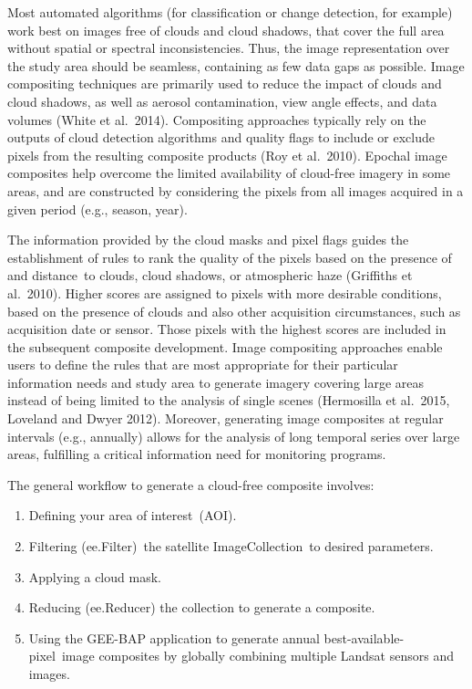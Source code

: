 \documentclass[
  letterpaper,
  DIV=11,
  numbers=noendperiod]{scrreprt}
\providecommand{\tightlist}{%
  \setlength{\itemsep}{0pt}\setlength{\parskip}{0pt}}\usepackage{longtable,booktabs,array}
\begin{document}
Most automated algorithms (for classification or change detection, for
example) work best on images free of clouds and cloud shadows, that
cover the full area without spatial or spectral inconsistencies. Thus,
the image representation over the study area should be seamless,
containing as few data gaps as possible. Image compositing techniques
are primarily used to reduce the impact of clouds and cloud shadows, as
well as aerosol contamination, view angle effects, and data volumes
(White et al.~2014). Compositing approaches typically rely on the
outputs of cloud detection algorithms and quality flags to include or
exclude pixels from the resulting composite products (Roy et al.~2010).
Epochal image composites help overcome the limited availability of
cloud-free imagery in some areas, and are constructed by considering the
pixels from all images acquired in a given period (e.g., season, year).

The information provided by the cloud masks and pixel flags guides the
establishment of rules to rank the quality of the pixels based on the
presence of and distance~to clouds, cloud shadows, or atmospheric haze
(Griffiths et al.~2010). Higher scores are assigned to pixels with more
desirable conditions, based on the presence of clouds and also other
acquisition circumstances, such as acquisition date or sensor. Those
pixels with the highest scores are included in the subsequent composite
development. Image compositing approaches enable users to define the
rules that are most appropriate for their particular information needs
and study area to generate imagery covering large areas instead of being
limited to the analysis of single scenes (Hermosilla et al.~2015,
Loveland and Dwyer 2012). Moreover, generating image composites at
regular intervals (e.g., annually) allows for the analysis of long
temporal series over large areas, fulfilling a critical information need
for monitoring programs.

The general workflow to generate a cloud-free composite involves:

\begin{enumerate}
\def\labelenumi{\arabic{enumi}.}
\tightlist
\item
  Defining your area of interest~(AOI).
\item
  Filtering (ee.Filter)~the satellite ImageCollection~to desired
  parameters.
\item
  Applying a cloud mask.
\item
  Reducing (ee.Reducer) the collection to generate a composite.
\item
  Using the GEE-BAP application to generate annual
  best-available-pixel~image composites by globally combining multiple
  Landsat sensors and images.
\end{enumerate}
\end{document}
